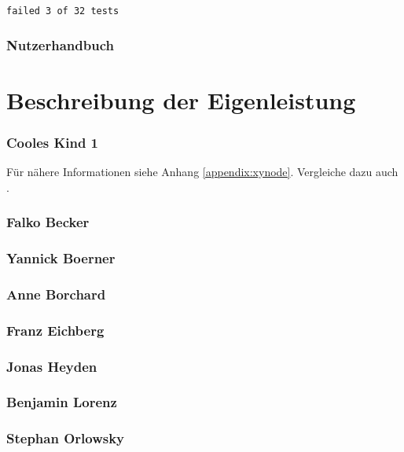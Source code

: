 \documentclass[a4paper, 12pt, titlepage]{scrartcl}
\begin{document}
{\begin{lstlisting}[basicstyle=\tiny]
failed 3 of 32 tests
\end{lstlisting}
		
	\section{Nutzerhandbuch} 
	\label{nutzerhandbuch}
\newpage
\part{Beschreibung der Eigenleistung}
\label{eigenleistung}
	\section{Cooles Kind 1}
		Für nähere Informationen siehe Anhang \ref{appendix:xynode}. Vergleiche dazu auch \cite{ibm}.
	\section{Falko Becker}
	\section{Yannick Boerner}
	\section{Anne Borchard}
	\section{Franz Eichberg}
	\section{Jonas Heyden}
	\section{Benjamin Lorenz}
	\section{Stephan Orlowsky}
	
\newpage
\printbibliography

%
\renewcommand\appendixtocname{Anhang} %
\renewcommand\appendixpagename{Anhang}
\renewcommand\appendixname{Anhang}

}
\end{document}
